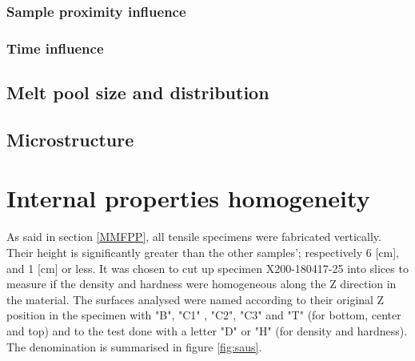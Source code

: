 \subsubsection{Sample proximity influence}

\subsubsection{Time influence}

\subsection{Melt pool size and distribution}

\subsection{Microstructure}

\section{Internal properties homogeneity}
As said in section \ref{MMFPP}, all tensile specimens were fabricated vertically. Their height is significantly greater than the other samples'; respectively 6 [cm], and 1 [cm] or less. It was chosen to cut up specimen X200-180417-25 into slices to measure if the density and hardness were homogeneous along the Z direction in the material. The surfaces analysed were named according to their original Z position in the specimen with "B", "C1" , "C2", "C3" and "T" (for bottom, center and top) and to the test done with a letter "D" or "H"  (for density and hardness). The denomination is summarised in figure \ref{fig:saus}.\\

